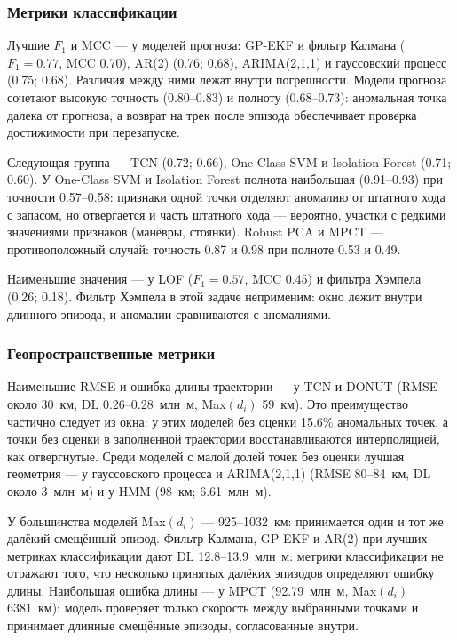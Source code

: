 \documentclass[a4paper,12pt]{report}
\begin{document}
\subsubsection{Метрики классификации}

Лучшие $F_1$ и MCC --- у моделей прогноза: GP-EKF и фильтр Калмана ($F_1=0.77$, MCC 0.70), AR(2) (0.76; 0.68), ARIMA(2,1,1) и гауссовский процесс (0.75; 0.68). Различия между ними лежат внутри погрешности. Модели прогноза сочетают высокую точность (0.80--0.83) и полноту (0.68--0.73): аномальная точка далека от прогноза, а возврат на трек после эпизода обеспечивает проверка достижимости при перезапуске.

Следующая группа --- TCN (0.72; 0.66), One-Class SVM и Isolation Forest (0.71; 0.60). У One-Class SVM и Isolation Forest полнота наибольшая (0.91--0.93) при точности 0.57--0.58: признаки одной точки отделяют аномалию от штатного хода с запасом, но отвергается и часть штатного хода --- вероятно, участки с редкими значениями признаков (манёвры, стоянки). Robust PCA и MPCT --- противоположный случай: точность 0.87 и 0.98 при полноте 0.53 и 0.49.

Наименьшие значения --- у LOF ($F_1=0.57$, MCC 0.45) и фильтра Хэмпела (0.26; 0.18). Фильтр Хэмпела в этой задаче неприменим: окно лежит внутри длинного эпизода, и аномалии сравниваются с аномалиями.

\subsubsection{Геопространственные метрики}

Наименьшие RMSE и ошибка длины траектории --- у TCN и DONUT (RMSE около 30~км, DL 0.26--0.28~млн~м, Max$(d_i)$ 59~км). Это преимущество частично следует из окна: у этих моделей без оценки 15.6\% аномальных точек, а точки без оценки в заполненной траектории восстанавливаются интерполяцией, как отвергнутые. Среди моделей с малой долей точек без оценки лучшая геометрия --- у гауссовского процесса и ARIMA(2,1,1) (RMSE 80--84~км, DL около 3~млн~м) и у HMM (98~км; 6.61~млн~м).

У большинства моделей Max$(d_i)$ --- 925--1032~км: принимается один и тот же далёкий смещённый эпизод. Фильтр Калмана, GP-EKF и AR(2) при лучших метриках классификации дают DL 12.8--13.9~млн~м: метрики классификации не отражают того, что несколько принятых далёких эпизодов определяют ошибку длины. Наибольшая ошибка длины --- у MPCT (92.79~млн~м, Max$(d_i)$ 6381~км): модель проверяет только скорость между выбранными точками и принимает длинные смещённые эпизоды, согласованные внутри.
\end{document}
